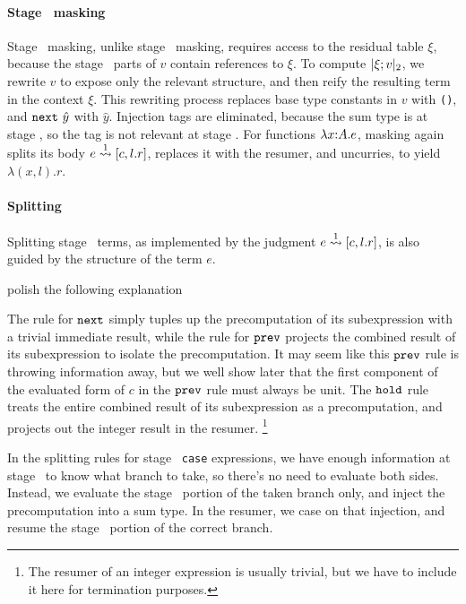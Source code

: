 \paragraph{Stage \bbtwo\ masking}

Stage \bbtwo\ masking, unlike stage \bbone\ masking, requires access to the
residual table $\xi$, because the stage \bbtwo\ parts of $v$ contain references
to $\xi$. To compute $|\xi;v|_{ 2}$, we rewrite $v$ to expose only the relevant
structure, and then reify the resulting term in the context $\xi$. This
rewriting process replaces base type constants in $v$ with \texttt{()}, and
${\tt next}~\hat{y}$ with $\hat{y}$. Injection tags are eliminated, because the sum
type is at stage \bbone, so the tag is not relevant at stage \bbtwo. For
functions $\lambda{x}\mathrm{:}{A}.{e}$, masking again splits its body $e\overset{ 1}\rightsquigarrow [c,l.r]$,
replaces it with the resumer, and uncurries, to yield $\lambda (x,l).r$.

\paragraph{Splitting}

Splitting stage \bbone\ terms, as implemented by the judgment $e\overset{ 1}\rightsquigarrow
[c,l.r]$, is also guided by the structure of the term $e$.

\TODO polish the following explanation

The rule for ${\tt next}$ simply tuples up the precomputation of its subexpression with a trivial immediate result,
while the rule for ${\tt prev}$ projects the combined result of its subexpression to isolate the precomputation.
It may seem like this ${\tt prev}$ rule is throwing information away, but we well show later that the first component 
of the evaluated form of $c$ in the ${\tt prev}$ rule must always be unit.
The ${\tt hold}$ rule treats the entire combined result of its subexpression as a precomputation, 
and projects out the integer result in the resumer.%
\footnote{The resumer of an integer expression is usually trivial, 
but we have to include it here for termination purposes.}

In the splitting rules for stage \bbone\ {\tt case} expressions, we
have enough information at stage \bbone\ to know what branch to take, so there's
no need to evaluate both sides. Instead, we evaluate the stage \bbone\ portion of the
taken branch only, and inject the precomputation into a sum type. In the
resumer, we case on that injection, and resume the stage \bbtwo\ portion of the
correct branch.

